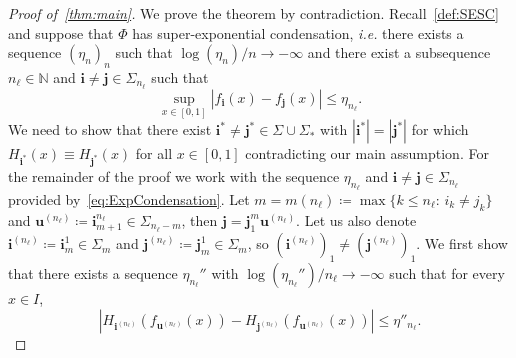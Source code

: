 \documentclass[12pt,]{article}
\def\cref#1{\ref{#1}}%
\theoremstyle{definition}
\theoremstyle{remark}
\renewcommand{\Bbb}[1]{\mathbb{#1}}
\newcommand{\bbN}{{\Bbb N}}         %
\newcommand{\0}{\mathbf{0}}
\newcommand{\bi}{\mathbf{i}}
\newcommand{\bj}{\mathbf{j}}
\newcommand{\bu}{\mathbf{u}}
\begin{document}
\begin{proof}[Proof of~\cref{thm:main}]
We prove the theorem by contradiction. Recall~\cref{def:SESC} and suppose that $\Phi$ has
super-exponential condensation, \emph{i.e.} there exists a sequence $(\eta_n)_n$ such that
$\log(\eta_n)/n\to-\infty$ and there exist a subsequence $n_{\ell}\in\bbN$ and
$\bi\neq\bj\in\Sigma_{n_\ell}$ such that
\begin{equation}\label{eq:ExpCondensation}
  \sup_{x\in[0,1]}|f_{\bi}(x)-f_{\bj}(x)| \leq \eta_{n_\ell}.
\end{equation}
We need to show that there exist $\bi^*\neq\bj^*\in\Sigma\cup\Sigma_*$ with $|\bi^*|=|\bj^*|$ for which $H_{\bi^*}(x)\equiv
H_{\bj^*}(x)$ for all $x\in[0,1]$ contradicting our main assumption. For the remainder of the proof
we work with the sequence $\eta_{n_{\ell}}$ and $\bi\neq\bj\in\Sigma_{n_\ell}$ provided
by~\cref{eq:ExpCondensation}. Let $m=m(n_{\ell})\coloneqq\max\{k\leq n_{\ell}:\, i_k\neq j_k\}$ and
$\bu^{(n_{\ell})}\coloneqq \bi_{m+1}^{n_{\ell}}\in\Sigma_{n_\ell-m}$, then
$\bj=\bj_1^m\bu^{(n_{\ell})}$. Let us also denote $\bi^{(n_{\ell})}\coloneqq\bi_m^1\in\Sigma_m$ and
$\bj^{(n_{\ell})}\coloneqq\bj_m^1\in\Sigma_m$, so $(\bi^{(n_{\ell})})_1\neq (\bj^{(n_{\ell})})_1$.
We first show that there exists a sequence $\eta_{n_{\ell}}''$ with
$\log(\eta_{n_{\ell}}'')/n_{\ell}\to-\infty$ such that for every $x\in I$,
\begin{equation}\label{eq:DiffH_iSUperExp}
|H_{\bi^{(n_\ell)}}(f_{\bu^{(n_\ell)}}(x)) - H_{\bj^{(n_\ell)}}(f_{\bu^{(n_\ell)}}(x))| \leq \eta''_{n_\ell}.
\end{equation}


\end{proof}
\end{document}
